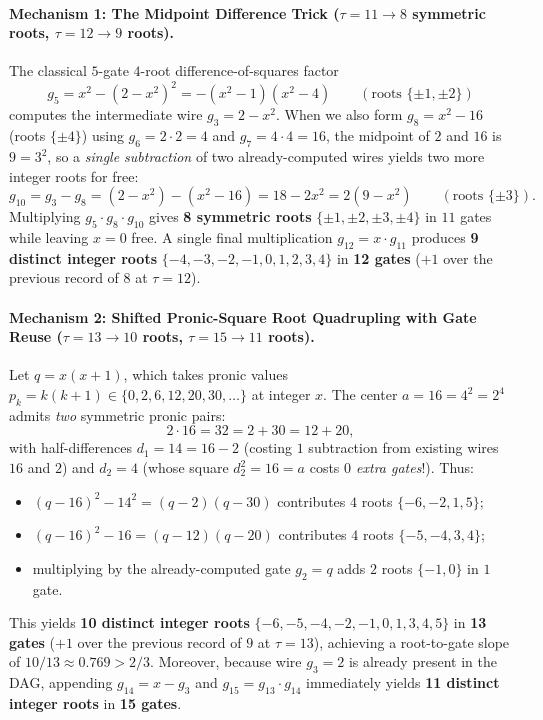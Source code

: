 \documentclass[11pt]{article}
\begin{document}
\paragraph{Mechanism 1: The Midpoint Difference Trick ($\tau = 11 \to 8$ symmetric roots, $\tau = 12 \to 9$ roots).}
The classical $5$-gate $4$-root difference-of-squares factor
\[
  g_5 = x^2 - (2 - x^2)^2 = -(x^2 - 1)(x^2 - 4) \qquad (\text{roots } \{\pm 1, \pm 2\})
\]
computes the intermediate wire $g_3 = 2 - x^2$. When we also form $g_8 = x^2 - 16$ (roots $\{\pm 4\}$) using $g_6 = 2 \cdot 2 = 4$ and $g_7 = 4 \cdot 4 = 16$, the midpoint of $2$ and $16$ is $9 = 3^2$, so a \emph{single subtraction} of two already-computed wires yields two more integer roots for free:
\[
  g_{10} = g_3 - g_8 = (2 - x^2) - (x^2 - 16) = 18 - 2x^2 = 2(9 - x^2) \qquad (\text{roots } \{\pm 3\}).
\]
Multiplying $g_5 \cdot g_8 \cdot g_{10}$ gives \textbf{8 symmetric roots} $\{\pm 1, \pm 2, \pm 3, \pm 4\}$ in $11$ gates while leaving $x = 0$ free. A single final multiplication $g_{12} = x \cdot g_{11}$ produces \textbf{9 distinct integer roots} $\{-4, -3, -2, -1, 0, 1, 2, 3, 4\}$ in \textbf{12 gates} ($+1$ over the previous record of $8$ at $\tau = 12$).

\paragraph{Mechanism 2: Shifted Pronic-Square Root Quadrupling with Gate Reuse ($\tau = 13 \to 10$ roots, $\tau = 15 \to 11$ roots).}
Let $q = x(x + 1)$, which takes pronic values $p_k = k(k+1) \in \{0, 2, 6, 12, 20, 30, \dots\}$ at integer $x$. The center $a = 16 = 4^2 = 2^4$ admits \emph{two} symmetric pronic pairs:
\[
  2 \cdot 16 = 32 = 2 + 30 = 12 + 20,
\]
with half-differences $d_1 = 14 = 16 - 2$ (costing $1$ subtraction from existing wires $16$ and $2$) and $d_2 = 4$ (whose square $d_2^2 = 16 = a$ costs \emph{$0$ extra gates}!). Thus:
\begin{itemize}[leftmargin=1.5em]
  \item $(q - 16)^2 - 14^2 = (q - 2)(q - 30)$ contributes $4$ roots $\{-6, -2, 1, 5\}$;
  \item $(q - 16)^2 - 16 = (q - 12)(q - 20)$ contributes $4$ roots $\{-5, -4, 3, 4\}$;
  \item multiplying by the already-computed gate $g_2 = q$ adds $2$ roots $\{-1, 0\}$ in $1$ gate.
\end{itemize}
This yields \textbf{10 distinct integer roots} $\{-6, -5, -4, -2, -1, 0, 1, 3, 4, 5\}$ in \textbf{13 gates} ($+1$ over the previous record of $9$ at $\tau = 13$), achieving a root-to-gate slope of $10/13 \approx 0.769 > 2/3$. Moreover, because wire $g_3 = 2$ is already present in the DAG, appending $g_{14} = x - g_3$ and $g_{15} = g_{13} \cdot g_{14}$ immediately yields \textbf{11 distinct integer roots} in \textbf{15 gates}.
\end{document}
